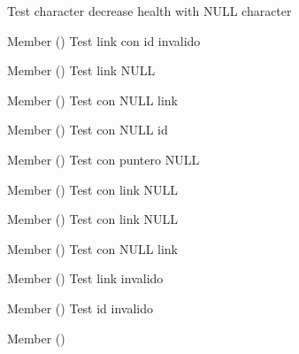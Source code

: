\begin{DoxyRefList}
\label{test__test000023}%
%
Test character decrease health with NULL character  
\item[Member \doxylink{link__test_8c_a24b5463da176c3e578b0a0fa8bb1f9f0}{test2\+\_\+link\+\_\+create} ()]\label{test__test000035}%
%
Test link con id invalido  
\item[Member \doxylink{link__test_8c_a63dbcd55ed0913dea30eba35884b5558}{test2\+\_\+link\+\_\+get\+\_\+direction} ()]\label{test__test000051}%
%
Test link NULL  
\item[Member \doxylink{link__test_8c_a08c6d4509d9735fedf74281866df30e1}{test2\+\_\+link\+\_\+get\+\_\+end} ()]\label{test__test000059}%
%
Test con NULL link  
\item[Member \doxylink{link__test_8c_a0f967a1782dd7264e73ad428d22d125d}{test2\+\_\+link\+\_\+get\+\_\+id} ()]\label{test__test000039}%
%
Test con NULL id  
\item[Member \doxylink{link__test_8c_a4efc6cfcdc210e2803f9d285734c571e}{test2\+\_\+link\+\_\+get\+\_\+name} ()]\label{test__test000043}%
%
Test con puntero NULL  
\item[Member \doxylink{link__test_8c_ae7fd2d7b8e2bc167b00fe8d42c065932}{test2\+\_\+link\+\_\+get\+\_\+open} ()]\label{test__test000047}%
%
Test con link NULL  
\item[Member \doxylink{link__test_8c_a8f3c929b3016b23a920994306ffc28ef}{test2\+\_\+link\+\_\+get\+\_\+start} ()]\label{test__test000055}%
%
Test con link NULL  
\item[Member \doxylink{link__test_8c_ad749dc76d3a04b2860e30dc6667b138a}{test2\+\_\+link\+\_\+print} ()]\label{test__test000061}%
%
Test con NULL link  
\item[Member \doxylink{link__test_8c_a9290046ce1c540c50cc3b7de92291fe3}{test2\+\_\+link\+\_\+set\+\_\+direction} ()]\label{test__test000049}%
%
Test link invalido  
\item[Member \doxylink{link__test_8c_af1068e666ec9be607820ec66cce2acdd}{test2\+\_\+link\+\_\+set\+\_\+end} ()]\label{test__test000057}%
%
Test id invalido  
\item[Member \doxylink{link__test_8c_a2f107a28c71f764c8091747f48eaec3f}{test2\+\_\+link\+\_\+set\+\_\+id} ()]\label{test__test000037}%
%

\end{DoxyRefList}
